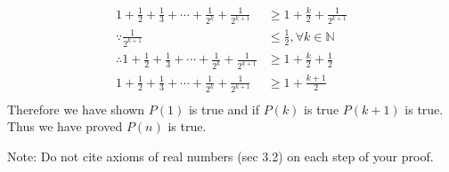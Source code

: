 \documentclass{article}
\newcommand{\D}{\displaystyle}
\begin{document}
\begin{enumerate}
\begin{align*}
	\D 1 + \frac{1}{2} + \frac{1}{3} + \cdots + \frac{1}{2^k} + \frac{1}{2^{k+1}} &\geq \D 1 + \frac{k}{2} + \frac{1}{2^{k+1}}\\
	\because \D \frac{1}{2^{k+1}} &\leq \D \frac{1}{2},\forall k \in \mathbb{N}\\
	\therefore \D 1 + \frac{1}{2} + \frac{1}{3} + \cdots + \frac{1}{2^k} + \frac{1}{2^{k+1}} &\geq \D 1 + \frac{k}{2} + \frac{1}{2}\\
	\D 1 + \frac{1}{2} + \frac{1}{3} + \cdots + \frac{1}{2^k} + \frac{1}{2^{k+1}} &\geq \D 1 + \frac{k+1}{2}\\
\end{align*}
Therefore we have shown $P(1)$ is true and if $P(k)$ is true $P(k+1)$ is true. Thus we have proved $P(n)$ is true.
\end{enumerate}

\bigskip
\bigskip
Note: Do not cite axioms of real numbers (sec 3.2) on each step of your proof.
\end{document}
